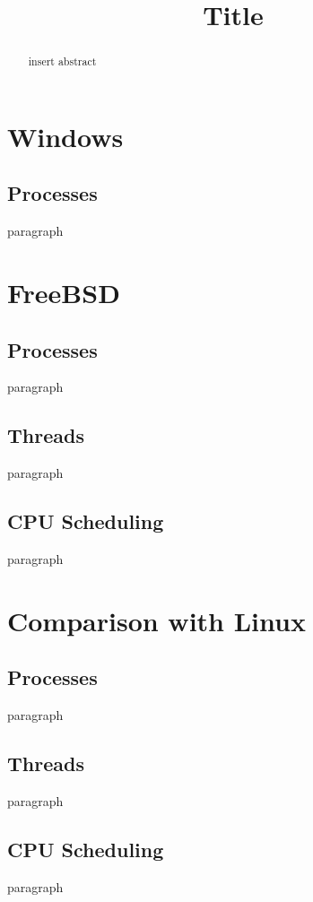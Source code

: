 \documentclass[letterpaper,10pt,draftclsnofoot,onecolumn]{IEEEtran}
\begin{document}
\title{Title}

\author{
}

\maketitle
\begin{abstract}
insert abstract
\par
\end{abstract}
\pagebreak
\tableofcontents
\pagebreak
\section{Windows}
\subsection{Processes}
paragraph
\par

\section{FreeBSD}
\subsection{Processes}
paragraph
\par

\subsection{Threads}
paragraph
\par

\subsection{CPU Scheduling}
paragraph
\par

\section{Comparison with Linux}
\subsection{Processes}
paragraph
\par

\subsection{Threads}
paragraph\par
\par

\subsection{CPU Scheduling}
paragraph
\par

\newpage


\end{document}
